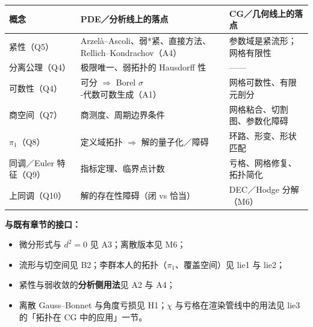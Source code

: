 \begin{center}
\begin{tabular}{L{3.0cm}L{5.4cm}L{5.6cm}}
\toprule
\textbf{概念} & \textbf{PDE／分析线上的落点} & \textbf{CG／几何线上的落点} \\
\midrule
紧性（Q5） & Arzelà--Ascoli、弱*紧、直接方法、Rellich--Kondrachov（A4） &
参数域是紧流形；网格有限性 \\
\addlinespace
分离公理（Q4） & 极限唯一、弱拓扑的 Hausdorff 性 & —— \\
\addlinespace
可数性（Q4） & 可分 $\Rightarrow$ Borel $\sigma$-代数可数生成（A1） & 网格可数性、有限元剖分 \\
\addlinespace
商空间（Q7） & 商测度、周期边界条件 & 网格粘合、切割图、参数化障碍 \\
\addlinespace
$\pi_1$（Q8） & 定义域拓扑 $\Rightarrow$ 解的量子化／障碍 & 环路、形变、形状匹配 \\
\addlinespace
同调／Euler 特征（Q9） & 指标定理、临界点计数 & 亏格、网格修复、拓扑简化 \\
\addlinespace
上同调（Q10） & 解的存在性障碍（闭 vs 恰当） & DEC／Hodge 分解（M6） \\
\bottomrule
\end{tabular}
\end{center}

\textbf{与既有章节的接口：}
\begin{itemize}
  \item 微分形式与 $d^2=0$ 见 A3；离散版本见 M6；
  \item 流形与切空间见 B2；李群本人的拓扑（$\pi_1$、覆盖空间）见 lie1 与 lie2；
  \item 紧性与弱收敛的\textbf{分析侧用法}见 A2 与 A4；
  \item 离散 Gauss--Bonnet 与角度亏损见 H1；$\chi$ 与亏格在渲染管线中的用法见 lie3 的「拓扑在 CG 中的应用」一节。
\end{itemize}
